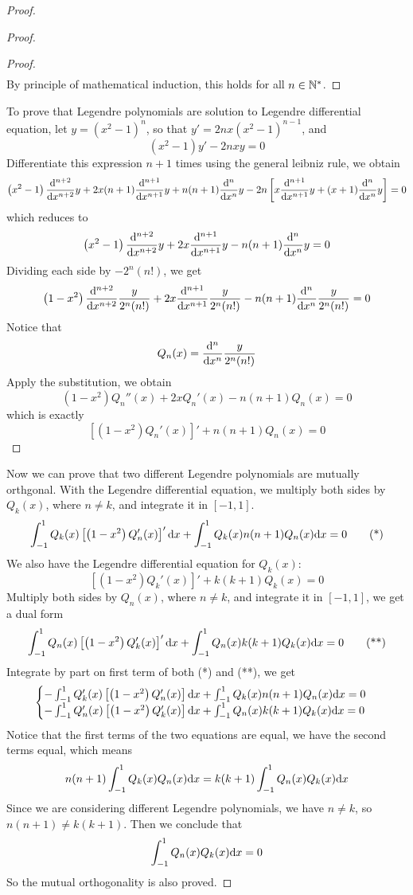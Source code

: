 \begin{enumerate}
\begin{proof}
\begin{proof}
\begin{proof}
\begin{align*}
	\end{align*}
	By principle of mathematical induction, this holds for all \(n\in\mathbb{N}^*\).
	\end{proof}
	To prove that Legendre polynomials are solution to Legendre differential equation, let \(y=\left(x^2-1\right)^n\), so that \(y'=2nx\left(x^2-1\right)^{n-1}\), and 
	\[ \left(x^2-1\right)y'-2nxy=0 \]
	Differentiate this expression \(n+1\) times using the general leibniz rule, we obtain
	\[ \left(x^2-1\right)\frac{\mathrm{d}^{n+2}}{\mathrm{d}{x}^{n+2}}y+2x(n+1)\frac{\mathrm{d}^{n+1}}{\mathrm{d}{x}^{n+1}}y+n(n+1)\frac{\mathrm{d}^{n}}{\mathrm{d}{x}^{n}}y-2n\left[x\frac{\mathrm{d}^{n+1}}{\mathrm{d}{x}^{n+1}}y+(x+1)\frac{\mathrm{d}^{n}}{\mathrm{d}{x}^{n}}y\right]=0 \]
	which reduces to 
	\[ \left(x^2-1\right)\frac{\mathrm{d}^{n+2}}{\mathrm{d}{x}^{n+2}}y+2x\frac{\mathrm{d}^{n+1}}{\mathrm{d}{x}^{n+1}}y-n(n+1)\frac{\mathrm{d}^{n}}{\mathrm{d}{x}^{n}}y=0 \]
	Dividing each side by \(-2^n(n!)\), we get
	\[ \left(1-x^2\right)\frac{\mathrm{d}^{n+2}}{\mathrm{d}{x}^{n+2}}\frac{y}{2^n(n!)}+2x\frac{\mathrm{d}^{n+1}}{\mathrm{d}{x}^{n+1}}\frac{y}{2^n(n!)}-n(n+1)\frac{\mathrm{d}^{n}}{\mathrm{d}{x}^{n}}\frac{y}{2^n(n!)}=0 \]
	Notice that
	\[ Q_n(x)=\frac{\mathrm{d}^{n}}{\mathrm{d}{x}^{n}}\frac{y}{2^n(n!)} \]
	Apply the substitution, we obtain
	\[ \left(1-x^2\right)Q_n''(x)+2xQ_n'(x)-n(n+1)Q_n(x)=0 \]
	which is exactly
	\[ \left[\left(1-x^2\right)Q_n'(x)\right]'+n(n+1)Q_n(x)=0 \]
	\end{proof}
	Now we can prove that two different Legendre polynomials are mutually orthgonal.
	With the Legendre differential equation, we multiply both sides by \(Q_k(x)\), where \(n\neq k\), and integrate it in \([-1,1]\).
	\[ \int_{-1}^{1} Q_k(x)\left[\left(1-x^2\right)Q_n'(x)\right]'\mathrm{d} x + \int_{-1}^{1}Q_k(x)n(n+1)Q_n(x)\mathrm{d} x=0 \tag{*} \]
	We also have the Legendre differential equation for \(Q_k(x)\):
	\[ \left[\left(1-x^2\right)Q_k'(x)\right]'+k(k+1)Q_k(x)=0 \]
	Multiply both sides by \(Q_n(x)\), where \(n\neq k\), and integrate it in \([-1,1]\), we get a dual form
	\[ \int_{-1}^{1} Q_n(x)\left[\left(1-x^2\right)Q_k'(x)\right]'\mathrm{d} x + \int_{-1}^{1}Q_n(x)k(k+1)Q_k(x)\mathrm{d} x=0 \tag{**} \]
	Integrate by part on first term of both (*) and (**), we get
	\[\begin{cases}
	-\int_{-1}^{1}Q_k'(x)\left[\left(1-x^2\right)Q_n'(x)\right]\mathrm{d} x+\int_{-1}^{1}Q_k(x)n(n+1)Q_n(x)\mathrm{d} x=0\\
	-\int_{-1}^{1}Q_n'(x)\left[\left(1-x^2\right)Q_k'(x)\right]\mathrm{d} x+\int_{-1}^{1}Q_n(x)k(k+1)Q_k(x)\mathrm{d} x=0
	\end{cases}\] 
	Notice that the first terms of the two equations are equal, we have the second terms equal, which means
	\[ n(n+1)\int_{-1}^{1}Q_k(x)Q_n(x)\mathrm{d} x=k(k+1)\int_{-1}^{1}Q_n(x)Q_k(x)\mathrm{d} x \]
	Since we are considering different Legendre polynomials, we have \(n\neq k\), so \(n(n+1)\neq k(k+1)\).
	Then we conclude that
	\[ \int_{-1}^{1}Q_n(x)Q_k(x)\mathrm{d} x=0 \]
	So the mutual orthogonality is also proved.

\end{proof}
\end{enumerate}
